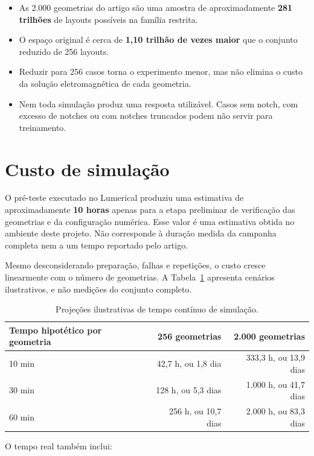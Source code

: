\documentclass[11pt,a4paper]{article}
\begin{document}
\begin{itemize}
\item As 2.000 geometrias do artigo são uma amostra de aproximadamente \textbf{281 trilhões} de layouts possíveis na família restrita.
\item O espaço original é cerca de \textbf{1,10 trilhão de vezes maior} que o conjunto reduzido de 256 layouts.
\item Reduzir para 256 casos torna o experimento menor, mas não elimina o custo da solução eletromagnética de cada geometria.
\item Nem toda simulação produz uma resposta utilizável. Casos sem notch, com excesso de notches ou com notches truncados podem não servir para treinamento.
\end{itemize}

\section{Custo de simulação}

O pré-teste executado no Lumerical produziu uma estimativa de aproximadamente \textbf{10 horas} apenas para a etapa preliminar de verificação das geometrias e da configuração numérica. Esse valor é uma estimativa obtida no ambiente deste projeto. Não corresponde à duração medida da campanha completa nem a um tempo reportado pelo artigo.

Mesmo desconsiderando preparação, falhas e repetições, o custo cresce linearmente com o número de geometrias. A Tabela~\ref{tab:tempo} apresenta cenários ilustrativos, e não medições do conjunto completo.

\begin{table}[htbp]
\centering
\caption{Projeções ilustrativas de tempo contínuo de simulação.}
\label{tab:tempo}
\begin{tabular}{@{}lrr@{}}
\toprule
Tempo hipotético por geometria & 256 geometrias & 2.000 geometrias \\
\midrule
10 min & 42,7 h, ou 1,8 dia & 333,3 h, ou 13,9 dias \\
30 min & 128 h, ou 5,3 dias & 1.000 h, ou 41,7 dias \\
60 min & 256 h, ou 10,7 dias & 2.000 h, ou 83,3 dias \\
\bottomrule
\end{tabular}
\end{table}

O tempo real também inclui:
\end{document}
